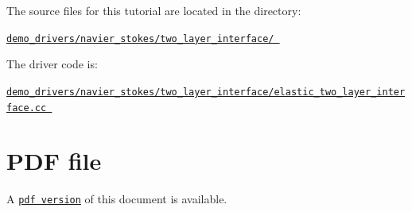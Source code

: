 \begin{DoxyItemize}
\item The source files for this tutorial are located in the directory\+: \begin{center} \href{../../../../demo_drivers/navier_stokes/two_layer_interface/}{\tt demo\+\_\+drivers/navier\+\_\+stokes/two\+\_\+layer\+\_\+interface/ } \end{center} 
\item The driver code is\+: \begin{center} \href{../../../../demo_drivers/navier_stokes/two_layer_interface/elastic_two_layer_interface.cc}{\tt demo\+\_\+drivers/navier\+\_\+stokes/two\+\_\+layer\+\_\+interface/elastic\+\_\+two\+\_\+layer\+\_\+interface.\+cc } \end{center} 
\end{DoxyItemize}



 

 \hypertarget{index_pdf}{}\section{P\+D\+F file}\label{index_pdf}
A \href{../latex/refman.pdf}{\tt pdf version} of this document is available. 
